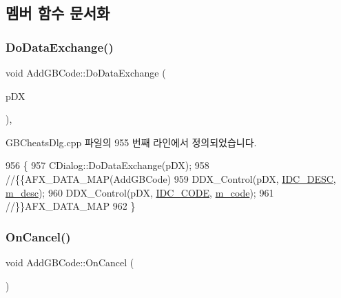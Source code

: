 \subsection{멤버 함수 문서화}
\mbox{\label{class_add_g_b_code_a7ae9f69b6acec1cb7816dc4959ba0b1c}} 
\subsubsection{\texorpdfstring{Do\+Data\+Exchange()}{DoDataExchange()}}
{\footnotesize\ttfamily void Add\+G\+B\+Code\+::\+Do\+Data\+Exchange (\begin{DoxyParamCaption}\item[{C\+Data\+Exchange $\ast$}]{p\+DX }\end{DoxyParamCaption})\hspace{0.3cm}{\ttfamily [protected]}, {\ttfamily [virtual]}}



G\+B\+Cheats\+Dlg.\+cpp 파일의 955 번째 라인에서 정의되었습니다.


\begin{DoxyCode}
956 \{
957   CDialog::DoDataExchange(pDX);
958   \textcolor{comment}{//\{\{AFX\_DATA\_MAP(AddGBCode)}
959   DDX\_Control(pDX, \mbox{\hyperlink{resource_8h_adb05cf1e74135587a9b3ab93a5152feb}{IDC\_DESC}}, \mbox{\hyperlink{class_add_g_b_code_af67488ee0354c39ce9c818e7f389e74f}{m\_desc}});
960   DDX\_Control(pDX, \mbox{\hyperlink{resource_8h_abb149f0043fd3834639ddb2d80d31723}{IDC\_CODE}}, \mbox{\hyperlink{class_add_g_b_code_a1336063b1498bee29c2a9df7273d8ca9}{m\_code}});
961   \textcolor{comment}{//\}\}AFX\_DATA\_MAP}
962 \}
\end{DoxyCode}
\mbox{\label{class_add_g_b_code_a0ebf90bce5407457b60eb77237adec17}} 
\subsubsection{\texorpdfstring{On\+Cancel()}{OnCancel()}}
{\footnotesize\ttfamily void Add\+G\+B\+Code\+::\+On\+Cancel (\begin{DoxyParamCaption}{ }\end{DoxyParamCaption})\hspace{0.3cm}{\ttfamily [protected]}}



